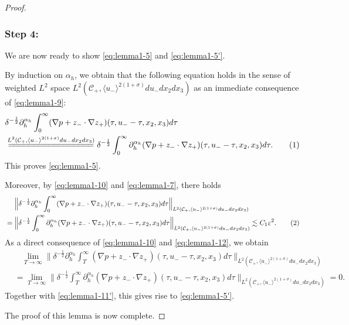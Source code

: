 \documentclass[10pt,reqno]{amsart}
\numberwithin{equation}{section}
\begin{document}
\begin{proof}
 

\subsubsection*{\bf Step 4:} We are now ready to show \eqref{eq:lemma1-5} and \eqref{eq:lemma1-5'}.

By induction on $\alpha_h$,  we obtain that the following equation holds in the sense of  weighted $L^2$
space $L^2(\mathcal{C}_+,\langle u_{-}\rangle^{2(1+\sigma)} du_-dx_2dx_3)$ as an immediate consequence of  \eqref{eq:lemma1-9}:
\begin{align*}
	& 
	\delta^{-\frac{1}{2}}\partial_h^{\alpha_h}\int_0^{\infty}(\nabla p+z_{-}\cdot\nabla z_{+}) 
	(\tau,u_--\tau,x_2,x_3)d\tau\\
	&\stackrel{ L^2(\mathcal{C}_+,\langle u_-\rangle^{2(1+\sigma)}du_-dx_2dx_3)}{=\joinrel=\joinrel=\joinrel=\joinrel=\joinrel=\joinrel=\joinrel=\joinrel=\joinrel=\joinrel=\joinrel=\joinrel=\joinrel=\joinrel=\joinrel=\joinrel=}\delta^{-\frac{1}{2}}\int_0^{\infty} \partial_h^{\alpha_h}(\nabla p+z_{-}\cdot\nabla z_{+}) 
	(\tau,u_--\tau,x_2,x_3)d\tau.\stepcounter{equation}\tag{\theequation}\label{eq:lemma1-10}
\end{align*}
This proves \eqref{eq:lemma1-5}. 

Moreover, by \eqref{eq:lemma1-10} and \eqref{eq:lemma1-7}, there holds 
\begin{align*}
&\ \ \ \ \Big\|\delta^{-\frac{1}{2}}\partial_h^{\alpha_h}\int_0^{\infty} (\nabla p+z_{-}\cdot\nabla z_{+}) 
(\tau,u_--\tau,x_2,x_3)d\tau\Big\|_{L^2(\mathcal{C}_+,\langle u_-\rangle^{2(1+\sigma)}du_-dx_2dx_3)}\\
&=\Big\|\delta^{-\frac{1}{2}}\int_0^{\infty} \partial_h^{\alpha_h}(\nabla p+z_{-}\cdot\nabla z_{+}) 
(\tau,u_--\tau,x_2,x_3)d\tau\Big\|_{L^2(\mathcal{C}_+,\langle u_-\rangle^{2(1+\sigma)}du_-dx_2dx_3)}
\lesssim C_1\varepsilon^2.\stepcounter{equation}\tag{\theequation}\label{eq:lemma1-12}
\end{align*}
As a direct consequence of   \eqref{eq:lemma1-10} and  \eqref{eq:lemma1-12}, we obtain 
\begin{align*}
&\ \ \ \ \lim_{T\to \infty}\Big\|\delta^{-\frac{1}{2}}\partial_h^{\alpha_h}\int_T^{\infty} (\nabla p+z_{-}\cdot\nabla z_{+}) 
(\tau,u_--\tau,x_2,x_3)d\tau\Big\|_{L^2(\mathcal{C}_+,\langle u_-\rangle^{2(1+\sigma)}du_-dx_2dx_3)}\\
&=\lim_{T\to \infty}\Big\|\delta^{-\frac{1}{2}}\int_T^{\infty}\partial_h^{\alpha_h} (\nabla p+z_{-}\cdot\nabla z_{+}) 
(\tau,u_--\tau,x_2,x_3)d\tau\Big\|_{L^2(\mathcal{C}_+,\langle u_-\rangle^{2(1+\sigma)}du_-dx_2dx_3)}=0.
\end{align*}
Together with \eqref{eq:lemma1-11'}, this gives rise to \eqref{eq:lemma1-5'}.

The proof of this lemma is now complete.
\end{proof}
\end{document}
